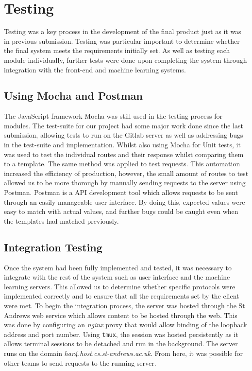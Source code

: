 \section{Testing}
Testing was a key process in the development of the final product just as it was in previous submission. Testing was particular important to determine whether the final system meets the requirements initially set. As well as testing each module individually, further tests were done upon completing the system through integration with the front-end and machine learning systems.

\subsection{Using Mocha and Postman}
The JavaScript framework Mocha was still used in the testing process for modules. The test-suite for our project had some major work done since the last submission, allowing tests to run on the Gitlab server as well as addressing bugs in the test-suite and implementation. Whilst also using Mocha for Unit tests, it was used to test the individual routes and their response whilst comparing them to a template. The same method was applied to test requests. This automation increased the efficiency of production, however, the small amount of routes to test allowed us to be more thorough by manually sending requests to the server using Postman. Postman is a API development tool which allows requests to be sent through an easily manageable user interface. By doing this, expected values were easy to match with actual values, and further bugs could be caught even when the templates had matched previously.

\subsection{Integration Testing}
Once the system had been fully implemented and tested, it was necessary to integrate with the rest of the system such as user interface and the machine learning servers. This allowed us to determine whether specific protocols were implemented correctly and to ensure that all the requirements set by the client were met. To begin the integration process, the server was hosted through the St Andrews web service which allows content to be hosted through the web. This was done by configuring an \textit{nginx} proxy that would allow binding of the loopback address and port number. Using \texttt{tmux}, the session was hosted persistently as it allows terminal sessions to be detached and run in the background. The server runs on the domain \textit{har4.host.cs.st-andrews.ac.uk}. From here, it was possible for other teams to send requests to the running server.
